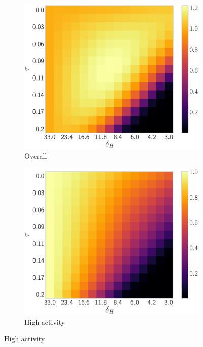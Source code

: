 \documentclass[10pt]{article}
\newlength{\figi}  \setlength{\figi}  {0.800\textwidth}
\newlength{\figii} \setlength{\figii} {0.490\textwidth}
\newlength{\figiii}\setlength{\figiii}{0.325\textwidth}
\numberwithin{equation}{section}
\begin{document}
\begin{figure}
  \centering
  \begin{subfigure}{\figiii}
    \includegraphics[width=\textwidth]{2d-prevalence-norm-all.eps}
    \caption{Overall}
    \label{fig:2d-prev-norm-all}
  \end{subfigure}
  \begin{subfigure}{\figiii}
    \includegraphics[width=\textwidth]{2d-prevalence-norm-high.eps}
    \caption{High activity}
    \label{fig:2d-prev-norm-high}
  \end{subfigure}

\end{figure}
\end{document}

